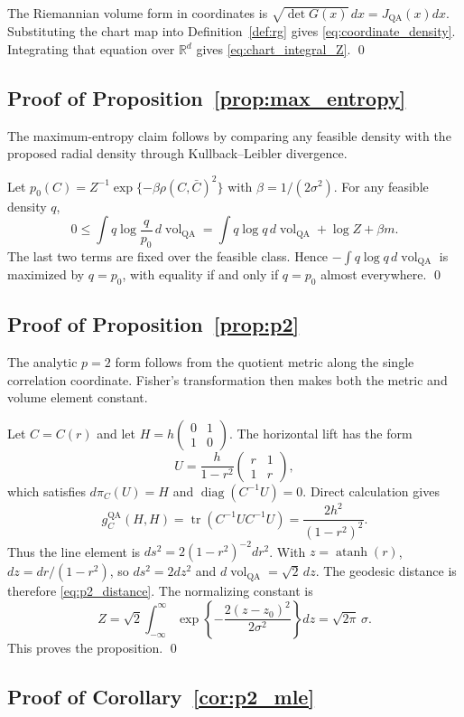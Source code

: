 \documentclass[
  12pt]{article}
\newcommand{\diag}{\operatorname{diag}}
\newcommand{\tr}{\operatorname{tr}}
\newcommand{\vol}{\operatorname{vol}}
\newcommand{\R}{\mathbb R}
\newcommand{\QA}{\mathrm{QA}}
\begin{document}
The Riemannian volume form in coordinates is $\sqrt{\det G(x)}\,dx=J_{\QA}(x)dx$. Substituting the chart map into Definition~\ref{def:rg} gives \eqref{eq:coordinate_density}. Integrating that equation over $\R^d$ gives \eqref{eq:chart_integral_Z}. \qed

\subsection{Proof of Proposition~\ref{prop:max_entropy}}

The maximum-entropy claim follows by comparing any feasible density with the proposed radial density through Kullback--Leibler divergence.

Let $p_0(C)=Z^{-1}\exp\{-\beta\rho(C,\bar C)^2\}$ with $\beta=1/(2\sigma^2)$. For any feasible density $q$,
\[
0\le \int q\log\frac{q}{p_0}\,d\vol_{\QA}=\int q\log q\,d\vol_{\QA}+\log Z+\beta m.
\]
The last two terms are fixed over the feasible class. Hence $-\int q\log q\,d\vol_{\QA}$ is maximized by $q=p_0$, with equality if and only if $q=p_0$ almost everywhere. \qed

\subsection{Proof of Proposition~\ref{prop:p2}}

The analytic $p=2$ form follows from the quotient metric along the single correlation coordinate. Fisher's transformation then makes both the metric and volume element constant.

Let $C=C(r)$ and let $H=h\begin{pmatrix}0&1\\1&0\end{pmatrix}$. The horizontal lift has the form
\[
U=\frac{h}{1-r^2}\begin{pmatrix}r&1\\1&r\end{pmatrix},
\]
which satisfies $d\pi_C(U)=H$ and $\diag(C^{-1}U)=0$. Direct calculation gives
\[
g_C^{\QA}(H,H)=\tr(C^{-1}UC^{-1}U)=\frac{2h^2}{(1-r^2)^2}.
\]
Thus the line element is $ds^2=2(1-r^2)^{-2}dr^2$. With $z=\operatorname{atanh}(r)$, $dz=dr/(1-r^2)$, so $ds^2=2dz^2$ and $d\vol_{\QA}=\sqrt2\,dz$. The geodesic distance is therefore \eqref{eq:p2_distance}. The normalizing constant is
\[
Z=\sqrt2\int_{-\infty}^{\infty}\exp\left\{-\frac{2(z-z_0)^2}{2\sigma^2}\right\}dz=\sqrt{2\pi}\,\sigma.
\]
This proves the proposition. \qed

\subsection{Proof of Corollary~\ref{cor:p2_mle}}
\end{document}
